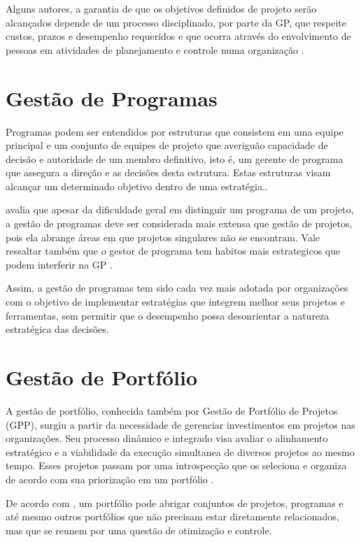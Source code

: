Alguns autores, a garantia de que os objetivos definidos de projeto serão alcançados depende de um processo disciplinado, por parte da GP, que respeite custos, prazos e desempenho requeridos e que ocorra através do envolvimento de pessoas em atividades de planejamento e controle numa organização \cite{dinsmore2009ama, meredith2011project}.

\section{Gestão de Programas}

Programas podem ser entendidos por estruturas que consistem em uma equipe principal e um conjunto de equipes de projeto que averiguão capacidade de decisão e autoridade de um membro definitivo, isto é, um gerente de programa que assegura a direção e as decisões desta estrutura. Estas estruturas visam alcançar um determinado objetivo dentro de uma estratégia.\cite{brown2008handbook}.

 avalia que apesar da dificuldade geral em distinguir um programa de um projeto, a gestão de programas deve ser considerada mais extensa que gestão de projetos, pois ela abrange áreas em que projetos singulares não se encontram. Vale ressaltar também que o gestor de programa tem habitos mais estrategicos que podem interferir na GP \cite{lycett2004289}.

Assim, a gestão de programas tem sido cada vez mais adotada por organizações com o objetivo de implementar estratégias que integrem melhor seus projetos e ferramentas, sem permitir que o desempenho possa desonrientar a natureza estratégica das decisões.


\section{Gestão de Portfólio}

A gestão de portfólio, conhecida também por Gestão de Portfólio de Projetos (GPP), surgiu a partir da necessidade de gerenciar investimentos em projetos nas organizações. Seu processo dinâmico e integrado visa avaliar o alinhamento estratégico e a viabilidade da execução simultanea de diversos projetos ao mesmo tempo. Esses projetos passam por uma introspecção que os seleciona e organiza de acordo com sua priorização em um portfólio \cite{meredith2011project, kerzner2013project}.

De acordo com , um portfólio pode abrigar conjuntos de projetos, programas e até mesmo outros portfólios que não precisam estar diretamente relacionados, mas que se reunem por uma questão de otimização e controle.

